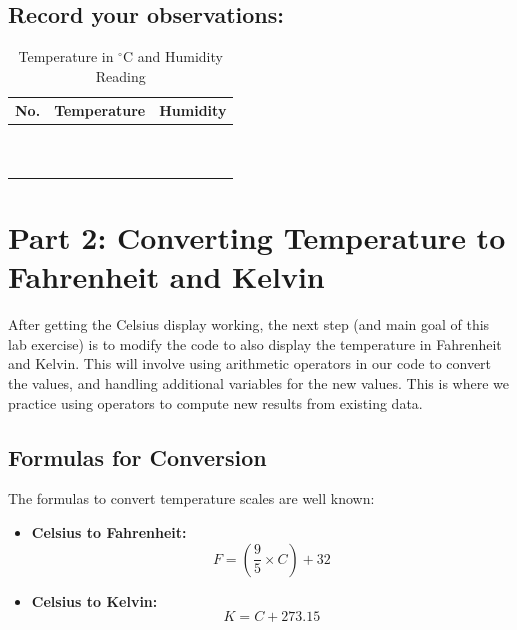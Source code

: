 \documentclass[a4paper,11pt]{article}
\begin{document}
\subsection*{Record your observations:}
\begin{table}[ht]
  \centering
  \renewcommand{\arraystretch}{1.5}
  \begin{tabular}{|p{1cm}|c|c|}
    \hline
    \textbf{No.} & \textbf{Temperature} & \textbf{Humidity} \\ \hline
     &  &  \\ \hline
     &  &  \\ \hline
     &  &  \\ \hline
     &  &  \\ \hline
     &  &  \\ \hline
     &  &  \\ \hline
     &  &  \\ \hline
     &  &  \\ \hline
     &  &  \\ \hline
     &  &  \\ \hline
  \end{tabular}
  \caption{Temperature in \(^\circ\text{C}\) and Humidity Reading}
  \label{tab:empty-3x10}
\end{table}

\newpage
\section*{Part 2: Converting Temperature to Fahrenheit and Kelvin }
After getting the Celsius display working, the next step (and main goal of this lab exercise) 
is to modify the code to also display the temperature in Fahrenheit and Kelvin. 
This will involve using arithmetic operators in our code to convert the values, 
and handling additional variables for the new values. This is where we practice 
using operators to compute new results from existing data.

\subsection*{Formulas for Conversion} 
The formulas to convert temperature scales are well known:

\begin{itemize}
  \item \textbf{Celsius to Fahrenheit:} 
  $$F = \left( \frac{9}{5} \times C \right) + 32$$

  \item \textbf{Celsius to Kelvin:} 
  $$K = C + 273.15$$

\end{itemize}
\end{document}
